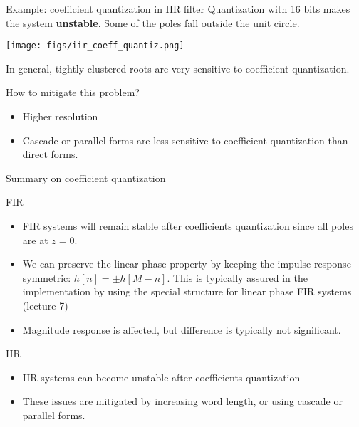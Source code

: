 \documentclass[10pt, aspectratio=169, handout]{beamer}
\begin{document}
\begin{frame}{Example: coefficient quantization in IIR filter}	
Quantization with 16 bits makes the system \textbf{unstable}. Some of the poles fall outside the unit circle.
\begin{center}
\texttt{[image: figs/iir\_coeff\_quantiz.png]}
\end{center}	

\pause
In general, tightly clustered roots are very sensitive to coefficient quantization.

How to mitigate this problem?
\begin{itemize}
\item Higher resolution
\item Cascade or parallel forms are less sensitive to coefficient quantization than direct forms.
\end{itemize}
\end{frame}


\begin{frame}{Summary on coefficient quantization}
\begin{block}{FIR}
	\begin{itemize}
		\item FIR systems will remain stable after coefficients quantization since all poles are at $z = 0$.
		\item We can preserve the linear phase property by keeping the impulse response symmetric: $h[n] = \pm h[M-n]$. This is typically assured in the implementation by using the special structure for linear phase FIR systems (lecture 7)
		\item Magnitude response is affected, but difference is typically not significant.
	\end{itemize}
\end{block}

\begin{block}{IIR}
	\begin{itemize}
		\item IIR systems can become unstable after coefficients quantization
		\item These issues are mitigated by increasing word length, or using cascade or parallel forms.
	\end{itemize}
\end{block}

\end{frame}

%
\end{document}
